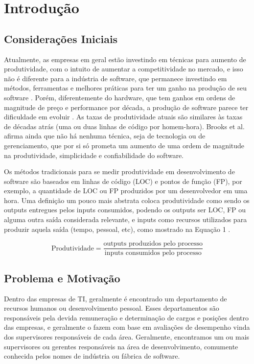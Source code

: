 \chapter[Introdução]{Introdução}

\section{Considerações Iniciais}\label{secao1.1}
Atualmente, as empresas em geral estão investindo em técnicas para aumento de produtividade, com o intuito de aumentar a competitividade no mercado, e isso não é diferente para a indústria de software, que permanece investindo em métodos, ferramentas e melhores práticas para ter um ganho na produção de seu software \cite{deBarrosSampaio2010}.
Porém, diferentemente do hardware, que tem ganhos em ordens de magnitude de preço e performance por década, a produção de software parece ter dificuldade em evoluir \cite{Boehm1987}. As taxas de produtividade atuais são similares às taxas de décadas atrás (uma ou duas linhas de código por homem-hora)\cite{Boehm1987}. Brooks et al. \cite{BrooksJr1987} afirma ainda que não há nenhuma técnica, seja de tecnologia ou de gerenciamento, que por si só prometa um aumento de uma ordem de magnitude na produtividade, simplicidade e confiabilidade do software.

Os métodos tradicionais para se medir produtividade em desenvolvimento de software são baseados em linhas de código (LOC) e pontos de função (FP)\cite{Wagner2008}, por exemplo, a quantidade de LOC ou FP produzidos por um desenvolvedor em uma hora. Uma definição um pouco mais abstrata coloca produtividade como sendo os outputs entregues pelos inputs consumidos, podendo os outputs ser LOC, FP ou alguma outra saída considerada relevante, e inputs como recursos utilizados para produzir aquela saída (tempo, pessoal, etc), como mostrado na Equação 1 \cite{Boehm1987, Walston1977, Yu1991}.

\begin{equation}
\text{Produtividade} = \dfrac{\text{outputs produzidos pelo processo}}{\text{inputs consumidos pelo processo}}
\end{equation} 

\section{Problema e Motivação}\label{secao1.2}
Dentro das empresas de TI, geralmente é encontrado um departamento de recursos humanos ou desenvolvimento pessoal. Esses departamentos são responsáveis pela devida remuneração e determinação de cargos e posições dentro das empresas, e geralmente o fazem com base em avaliações de desempenho vinda dos supervisores responsáveis de cada área. Geralmente, encontramos um ou mais supervisores ou gerentes responsáveis na área de desenvolvimento, comumente conhecida pelos nomes de indústria ou fábrica de software.

